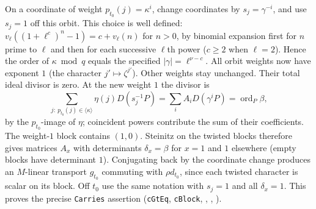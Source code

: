On a coordinate of weight $p_{t_0}(j)=\kappa^i$, change coordinates
by $s_j=\gamma^{-i}$, and use $s_j=1$ off this orbit. This choice is
well defined: $v_\ell((1+\ell^c)^n-1)=c+v_\ell(n)$ for $n>0$,
by binomial expansion first for $n$ prime to $\ell$ and then for each
successive $\ell$th power ($c\ge2$ when $\ell=2$). Hence the order
of $\kappa\bmod q$ equals the specified $|\gamma|=\ell^{\nu-c}$.
All orbit weights now have exponent $1$
(the character $j'\mapsto\zeta^{j'}$). Other weights stay unchanged.
Their total ideal divisor is zero. At the new weight $1$ the divisor is
\[
 \sum_{j:\ p_{t_0}(j)\in\langle\kappa\rangle}
 \eta(j)D(s_j^{-1}P)=\sum_i A_iD(\gamma^iP)
 =\operatorname{ord}_P\beta,
\]
by the $p_{t_0}$-image of $\eta$; coincident powers contribute the
sum of their coefficients. The weight-$1$ block contains $(1,0)$.
Steinitz on the twisted blocks therefore gives matrices $A_x$ with
determinants $\delta_x=\beta$ for $x=1$ and $1$ elsewhere (empty
blocks have determinant $1$). Conjugating back by the coordinate
change produces an $M$-linear transport $g_{t_0}$ commuting with
$\rho d_{t_0}$, since each twisted character is scalar on its block.
Off $t_0$ use the same notation with $s_j=1$ and all $\delta_x=1$.
This proves the precise \nolinkurl{Carries} assertion
(\nolinkurl{cGtEq}, \nolinkurl{cBlock},
,
,
).


